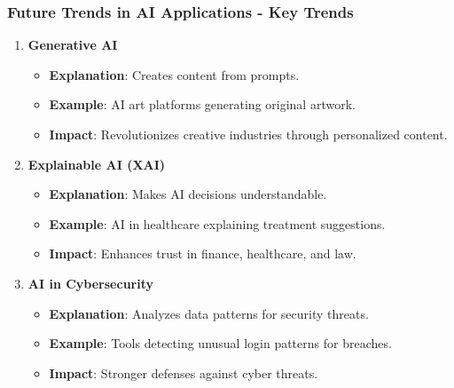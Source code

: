\documentclass[aspectratio=169]{beamer}
\begin{document}
\begin{frame}[fragile]
    \frametitle{Future Trends in AI Applications - Key Trends}
    \begin{enumerate}
        \item \textbf{Generative AI}
            \begin{itemize}
                \item \textbf{Explanation}: Creates content from prompts.
                \item \textbf{Example}: AI art platforms generating original artwork.
                \item \textbf{Impact}: Revolutionizes creative industries through personalized content.
            \end{itemize}
        
        \item \textbf{Explainable AI (XAI)}
            \begin{itemize}
                \item \textbf{Explanation}: Makes AI decisions understandable.
                \item \textbf{Example}: AI in healthcare explaining treatment suggestions.
                \item \textbf{Impact}: Enhances trust in finance, healthcare, and law.
            \end{itemize}

        \item \textbf{AI in Cybersecurity}
            \begin{itemize}
                \item \textbf{Explanation}: Analyzes data patterns for security threats.
                \item \textbf{Example}: Tools detecting unusual login patterns for breaches.
                \item \textbf{Impact}: Stronger defenses against cyber threats.
            \end{itemize}
    \end{enumerate}
\end{frame}
\end{document}
